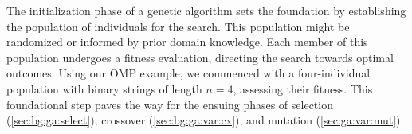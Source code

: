   The initialization phase of a genetic algorithm sets the foundation by 
  establishing the population of individuals for the search.
  This population might be randomized or informed by prior domain knowledge.
  Each member of this population undergoes a fitness evaluation, directing the 
  search towards optimal outcomes.
  Using our OMP example, we commenced with a four-individual population with 
  binary strings of length \(n = 4\), assessing their fitness.
  This foundational step paves the way for the ensuing phases of selection 
  (\vref{sec:bg:ga:select}), crossover 
  (\vref{sec:bg:ga:var:cx}), and mutation (\vref{sec:ga:var:mut}).
